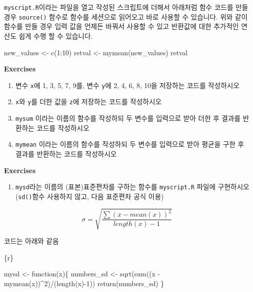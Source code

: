 \documentclass[
  a4paper,
]{book}
\newenvironment{Shaded}{\begin{snugshade}}{\end{snugshade}}
\newcommand{\ControlFlowTok}[1]{\textcolor[rgb]{0.00,0.23,0.31}{#1}}
\newcommand{\DecValTok}[1]{\textcolor[rgb]{0.68,0.00,0.00}{#1}}
\newcommand{\FunctionTok}[1]{\textcolor[rgb]{0.28,0.35,0.67}{#1}}
\newcommand{\InformationTok}[1]{\textcolor[rgb]{0.37,0.37,0.37}{#1}}
\newcommand{\NormalTok}[1]{\textcolor[rgb]{0.00,0.23,0.31}{#1}}
\newcommand{\OtherTok}[1]{\textcolor[rgb]{0.00,0.23,0.31}{#1}}
\newcommand{\SpecialCharTok}[1]{\textcolor[rgb]{0.37,0.37,0.37}{#1}}
\providecommand{\tightlist}{%
  \setlength{\itemsep}{0pt}\setlength{\parskip}{0pt}}\usepackage{longtable,booktabs,array}
\begin{document}
\texttt{myscript.R}이라는 파일을 열고 작성된 스크립트에 더해서 아래처럼
함수 코드를 만들 경우 \texttt{source()} 함수로 함수를 세션으로 읽어오고
바로 사용할 수 있습니다. 위와 같이 함수를 만들 경우 입력 값을 언제든
바꿔서 사용할 수 있고 반환값에 대한 추가적인 연산도 쉽게 수행 할 수
있습니다.

\begin{Shaded}
\begin{Highlighting}[]
\NormalTok{new\_values }\OtherTok{\textless{}{-}} \FunctionTok{c}\NormalTok{(}\DecValTok{1}\SpecialCharTok{:}\DecValTok{10}\NormalTok{)}
\NormalTok{retval }\OtherTok{\textless{}{-}} \FunctionTok{mymean}\NormalTok{(new\_values)}
\NormalTok{retval}
\end{Highlighting}
\end{Shaded}

\textbf{Exercises}

\begin{enumerate}
\def\labelenumi{\arabic{enumi})}
\item
  변수 \texttt{x}에 1, 3, 5, 7, 9를, 변수 \texttt{y}에 2, 4, 6, 8, 10을
  저장하는 코드를 작성하시오
\item
  \texttt{x}와 \texttt{y}를 더한 값을 \texttt{z}에 저장하는 코드를
  작성하시오
\item
  \texttt{mysum} 이라는 이름의 함수를 작성하되 두 변수를 입력으로 받아
  더한 후 결과를 반환하는 코드를 작성하시오
\item
  \texttt{mymean} 이라는 이름의 함수를 작성하되 두 변수를 입력으로 받아
  평균을 구한 후 결과를 반환하는 코드를 작성하시오
\end{enumerate}

\textbf{Exercises}

\begin{enumerate}
\def\labelenumi{\arabic{enumi})}
\tightlist
\item
  \texttt{mysd}라는 이름의 (표본)표준편차를 구하는 함수를
  \texttt{myscript.R} 파일에 구현하시오 (\texttt{sd()}함수 사용하지
  않고, 다음 표준편차 공식 이용)
\end{enumerate}

\[ 
\sigma = \sqrt{\frac{\sum(x-mean(x))^2}{length(x)-1}} 
\]

코드는 아래와 같음

\begin{Shaded}
\begin{Highlighting}[]
\InformationTok{\textasciigrave{}\textasciigrave{}\textasciigrave{}\{r\}}

\NormalTok{mysd }\OtherTok{\textless{}{-}} \ControlFlowTok{function}\NormalTok{(x)\{}
\NormalTok{  numbers\_sd }\OtherTok{\textless{}{-}} \FunctionTok{sqrt}\NormalTok{(}\FunctionTok{sum}\NormalTok{((x }\SpecialCharTok{{-}} \FunctionTok{mymean}\NormalTok{(x))}\SpecialCharTok{\^{}}\DecValTok{2}\NormalTok{)}\SpecialCharTok{/}\NormalTok{(}\FunctionTok{length}\NormalTok{(x)}\SpecialCharTok{{-}}\DecValTok{1}\NormalTok{))  }
  \FunctionTok{return}\NormalTok{(numbers\_sd)}
\NormalTok{\}}
\InformationTok{\textasciigrave{}\textasciigrave{}\textasciigrave{}}
\end{Highlighting}
\end{Shaded}
\end{document}
